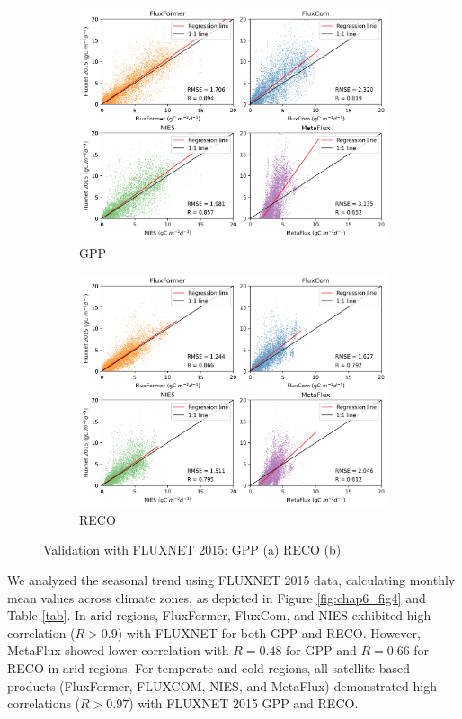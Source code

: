 \begin{figure}[p]
    \centering
    \begin{subfigure}{\textwidth}
      \centering
      \includegraphics[width=.8\textwidth]{figs/chap6/val_fluxnet_all_GPP.png}
      \caption{GPP}
      \label{fig:chap6_fig3a}
    \end{subfigure}

    \begin{subfigure}{\textwidth}
      \centering
      \includegraphics[width=.8\textwidth]{figs/chap6/val_fluxnet_all_RECO.png}
      \caption{RECO}
      \label{fig:chap6_fig3b}
    \end{subfigure}
    \caption[Validation with FLUXNET 2015]{Validation with FLUXNET 2015: GPP (a) RECO (b)}
    \label{fig:chap6_fig3}
\end{figure}
We analyzed the seasonal trend using FLUXNET 2015 data, calculating monthly mean values across climate zones, as depicted in Figure \ref{fig:chap6_fig4} and Table \ref{tab}. In arid regions, FluxFormer, FluxCom, and NIES exhibited high correlation ($R > 0.9$) with FLUXNET for both GPP and RECO. However, MetaFlux showed lower correlation with $R=0.48$ for GPP and $R=0.66$ for RECO in arid regions. For temperate and cold regions, all satellite-based products (FluxFormer, FLUXCOM, NIES, and MetaFlux) demonstrated high correlations ($R>0.97$) with FLUXNET 2015 GPP and RECO. \par

